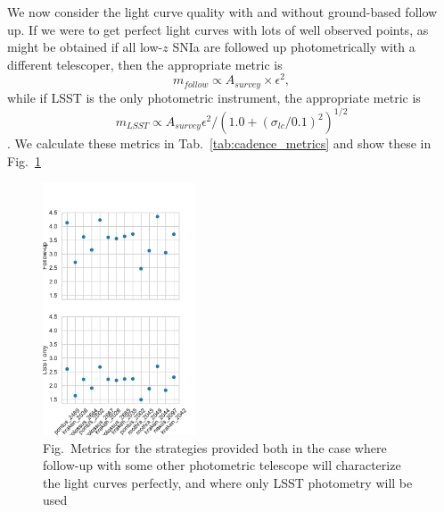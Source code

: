 We now consider the light curve quality with and without ground-based follow up.
If we were to get perfect light curves with lots of well observed points, as might be obtained if all low-$z$ SNIa are followed up photometrically with a different telescoper, then the appropriate metric is 
\begin{equation}
    m_{follow} \propto A_{survey} \times \epsilon^2,
\end{equation}
while if LSST is the only photometric instrument, the appropriate metric is
\begin{equation}
    m_{LSST} \propto A_{survey} \epsilon^2 /(1.0 + \left(\sigma_{lc}/0.1\right)^2)^{1/2}
\end{equation}. We calculate these metrics in Tab.~\ref{tab:cadence_metrics} and show these in Fig.~\ref{fig:cadence_metrics}

\begin{figure}
    \begin{center}
        \includegraphics[width=0.4\textwidth]{figures/metrics.pdf}
        \caption{Fig.~Metrics for the strategies provided both in the case where follow-up with some other photometric telescope will characterize the light curves perfectly, and where only LSST photometry will be used}
    \label{fig:cadence_metrics}
    \end{center}
\end{figure}


